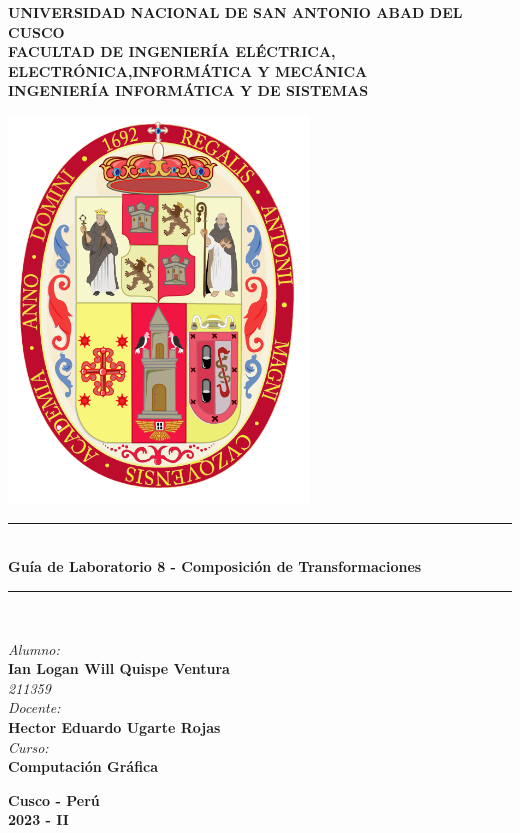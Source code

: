 \documentclass[a4paper]{article}
\begin{document}
\begin{titlepage}

\newcommand{\linea}{\rule{\linewidth}{0.7mm}} 
\center
\textbf{\Large UNIVERSIDAD NACIONAL DE SAN ANTONIO ABAD DEL CUSCO}\\[0.2cm]
\textbf{\Large FACULTAD DE INGENIERÍA ELÉCTRICA, ELECTRÓNICA,INFORMÁTICA Y MECÁNICA}\\[0.2cm]
\textbf{\Large INGENIERÍA INFORMÁTICA Y DE SISTEMAS\\[0.6cm]}

\includegraphics[width=8cm]{src/escudo-unsaac.png}
\vfill

\linea
\\[0.3cm]
\textbf{\LARGE Guía de Laboratorio 8 - Composición de Transformaciones}\\[0.2cm]
\linea \\
\vfill

\textit{\Large Alumno:}\\
    \textbf{\large Ian Logan Will Quispe Ventura}\\
    \textit{211359}\\

\vspace{0.3cm}
    \textit{\Large Docente:}\\
    \textbf{\large Hector Eduardo Ugarte Rojas}\\
\vspace{0.5cm}
    \textit{\Large Curso:}\\
    \textbf{\large Computación Gráfica}\\
    \vfill

\vspace{0.4cm}
    \textbf{\Large Cusco - Perú }\\
    \textbf{\large 2023 - II }\\
    \newpage
    \end{titlepage}
\end{document}
